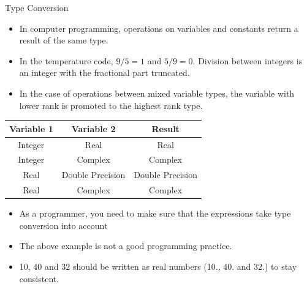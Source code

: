 \documentclass[10pt,t]{beamer}
\begin{document}
\begin{frame}{Type Conversion}
  \begin{itemize}
    \item In computer programming, operations on variables and constants return a result of the same type.
    \item In the temperature code, $9/5=1$ and $5/9=0$. Division between integers is an integer with the fractional part truncated.
    \item In the case of operations between mixed variable types, the variable with lower rank is promoted to the highest rank type.
  \end{itemize}
  \begin{eblock}{}
    \begin{center}
      \footnotesize
      \begin{tabular}{ccc}
        \hline
        Variable 1 & Variable 2 & Result \\
        \hline
        Integer & Real & Real \\
        Integer & Complex & Complex \\
        Real & Double Precision & Double Precision \\
        Real & Complex & Complex\\
        \hline
      \end{tabular}
    \end{center}
  \end{eblock}
  \framebreak
  \begin{itemize}
    \item As a programmer, you need to make sure that the expressions take type conversion into account
      \begin{columns}[t]
        Fortran},basicstyle=\fontsize{6}{5}\selectfont\ttfamily]{./Exercise/temp.f90}
        \column{0.6\textwidth}
        \begin{lstlisting}[basicstyle=\fontsize{6}{5}\selectfont\ttfamily]
altair:Exercise apacheco$ gfortran temp.f90
altair:Exercise apacheco$ ./a.out
 10C =    50.0000000     F
 40F =    4.44444466     C
        \end{lstlisting}
      \end{columns}
    \item The above example is not a good programming practice. 
    \item 10, 40 and 32 should be written as real numbers (10., 40. and 32.) to stay consistent. 
  \end{itemize}
\end{frame}
\end{document}
